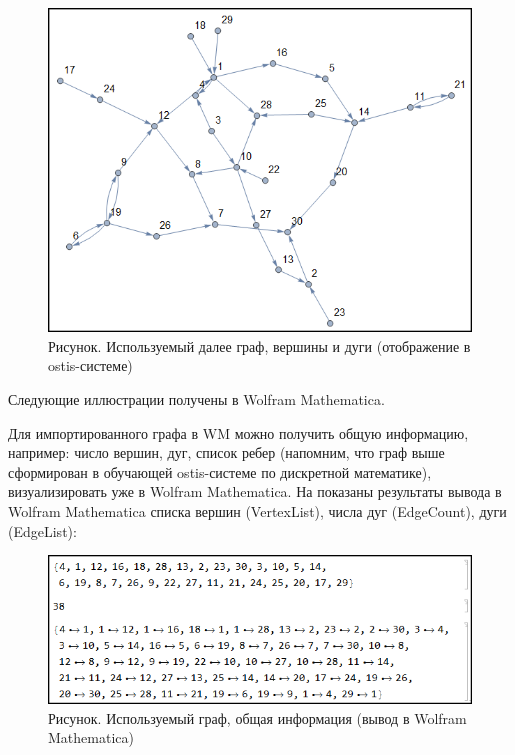 \begin{figure}[H]
	\centering
	\includegraphics[scale=0.9]{images/part7/chapter_integration/integr_alg31.png}
	\caption{Рисунок. Используемый далее граф, вершины и дуги (отображение в  ostis-системе)}
	\label{fig:integr_alg31}
\end{figure}

Следующие иллюстрации получены в Wolfram Mathematica. 

Для импортированного графа в WM можно получить общую информацию, например: число вершин, дуг, список ребер (напомним, что граф выше сформирован в обучающей ostis-системе по дискретной математике), визуализировать уже в Wolfram Mathematica. На \textit{}
показаны результаты вывода в Wolfram Mathematica списка вершин (VertexList), числа дуг (EdgeCount), дуги (EdgeList):
\begin{figure}[H]
	\centering
	\includegraphics[scale=0.65]{images/part7/chapter_integration/integr_alg31d.png}
	\caption{Рисунок. Используемый граф, общая информация (вывод в Wolfram Mathematica)}
	\label{fig:integr_alg31d}
\end{figure}

